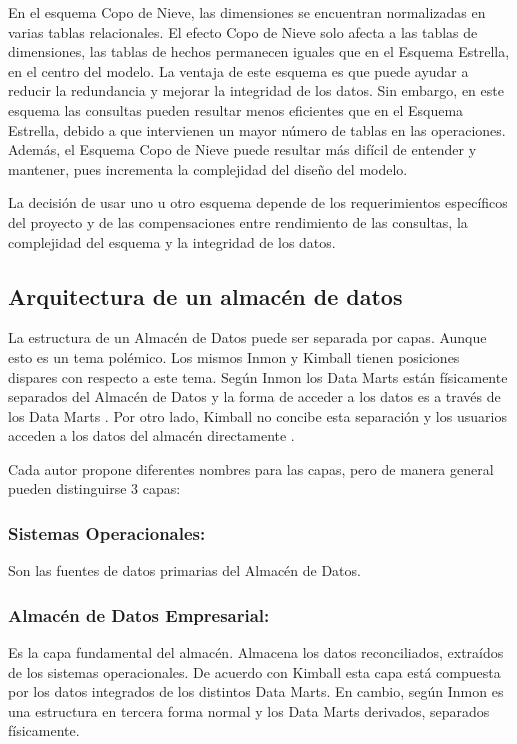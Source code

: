 En el esquema Copo de Nieve, las dimensiones se encuentran normalizadas en varias tablas relacionales. El efecto Copo de Nieve solo afecta a las tablas de 
dimensiones, las tablas de hechos permanecen iguales que en el Esquema Estrella, en el centro del modelo. La ventaja de este esquema es que puede ayudar a reducir 
la redundancia y mejorar la integridad de los datos. Sin embargo, en este esquema las consultas pueden resultar menos eficientes que en el Esquema Estrella, debido 
a que intervienen un mayor número de tablas en las operaciones. Adem\'as, el Esquema Copo de Nieve puede resultar m\'as dif\'icil de entender y mantener, pues incrementa la complejidad del 
dise\~{n}o del modelo.

La decisi\'on de usar uno u otro esquema depende de los requerimientos espec\'ificos del proyecto y de las compensaciones entre rendimiento de las consultas, 
la complejidad del esquema y la integridad de los datos.


\subsection{Arquitectura de un almac\'en de datos}

La estructura de un Almac\'en de Datos puede ser separada por capas. Aunque esto es un tema pol\'emico. Los mismos Inmon y Kimball tienen posiciones dispares 
con respecto a este tema. Seg\'un Inmon los Data Marts est\'an f\'isicamente separados del Almac\'en de Datos y la forma de acceder a los datos es a trav\'es de los Data Marts \cite{inmon2005building}.
Por otro lado, Kimball no concibe esta separaci\'on y los usuarios acceden a los datos del almac\'en directamente \cite{kimball2011data}.

Cada autor propone diferentes nombres para las capas, pero de manera general pueden distinguirse 3 capas:

\subsubsection{Sistemas Operacionales:}
Son las fuentes de datos primarias del Almac\'en de Datos.

\subsubsection{Almac\'en de Datos Empresarial:} 
Es la capa fundamental del almac\'en. Almacena los datos reconciliados, extra\'idos de los sistemas operacionales. De acuerdo con Kimball esta capa est\'a compuesta
por los datos integrados de los distintos Data Marts. En cambio, seg\'un Inmon es una estructura en tercera forma normal y los Data Marts derivados, separados f\'isicamente. 

